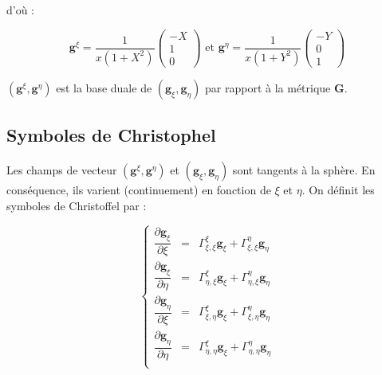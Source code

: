 d'où :

\begin{equation}
\mathbf{g}^{\xi} = \dfrac{1}{x(1+X^2)}\begin{pmatrix}
-X \\ 1 \\ 0
\end{pmatrix} \text{ et } \mathbf{g}^{\eta} = \dfrac{1}{x(1+Y^2)}\begin{pmatrix}
-Y \\ 0 \\ 1
\end{pmatrix}
\end{equation}

$( \mathbf{g}^{\xi}, \mathbf{g}^{\eta})$ est la base duale de $(\mathbf{g}_{\xi}, \mathbf{g}_{\eta})$ par rapport à la métrique $\mathbf{G}$.

\subsection{Symboles de Christophel}

Les champs de vecteur $( \mathbf{g}^{\xi}, \mathbf{g}^{\eta})$ et $( \mathbf{g}_ {\xi}, \mathbf{g}_{\eta})$ sont tangents à la sphère. En conséquence, ils varient (continuement) en fonction de $\xi$ et $\eta$. On définit les symboles de Christoffel par :

\begin{equation}
\left\lbrace
\begin{array}{rcl}
\dfrac{\partial \mathbf{g}_{\xi}}{\partial \xi} & = & \Gamma_{\xi,\xi}^{\xi} \mathbf{g}_{\xi} + \Gamma_{\xi,\xi}^{\eta} \mathbf{g}_{\eta}\\

\dfrac{\partial \mathbf{g}_{\xi}}{\partial \eta} & = & \Gamma_{\eta,\xi}^{\xi} \mathbf{g}_{\xi} + \Gamma_{\eta,\xi}^{\eta} \mathbf{g}_{\eta}\\

\dfrac{\partial \mathbf{g}_{\eta}}{\partial \xi} & = & \Gamma_{\xi,\eta}^{\xi} \mathbf{g}_{\xi} + \Gamma_{\xi,\eta}^{\eta} \mathbf{g}_{\eta}\\

\dfrac{\partial \mathbf{g}_{\eta}}{\partial \eta} & = & \Gamma_{\eta,\eta}^{\xi} \mathbf{g}_{\xi} + \Gamma_{\eta,\eta}^{\eta} \mathbf{g}_{\eta}\\
\end{array}
\right.
\end{equation}

